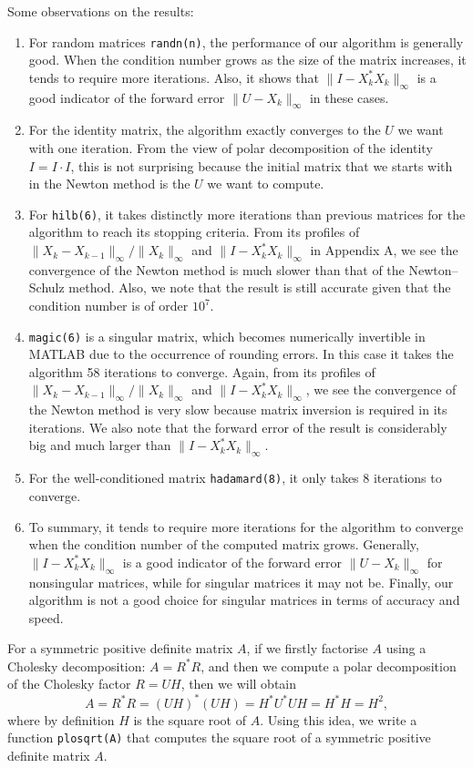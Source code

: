 \documentclass[12pt]{article}
\def\norm#1{\|#1\|}
\def\t#1{\texttt{\upshape #1}}
\begin{document}
Some observations on the results:
\begin{enumerate}
\item For random matrices \t{randn(n)}, the performance of our algorithm is generally good. When the condition number grows as the size of the matrix increases, it tends to require more iterations. Also, it shows that $\norm{I-X_k^*{X_k}}_\infty$ is a good indicator of the forward error $\norm{U-X_k}_\infty$ in these cases.
\item For the identity matrix, the algorithm exactly converges to the $U$ we want with one iteration. From the view of polar decomposition of the identity $I=I\cdot I$, this is not surprising because the initial matrix that we starts with in the Newton method is the $U$ we want to compute.
\item For \t{hilb(6)}, it takes distinctly more iterations than previous matrices for the algorithm to reach its stopping criteria. From its profiles of $\norm{X_k-X_{k-1}}_\infty/\norm{X_k}_\infty$ and $\norm{I-X_k^*{X_k}}_\infty$ in Appendix A, we see the convergence of the Newton method is much slower than that of the Newton--Schulz method. Also, we note that the result is still accurate given that the condition number is of order $10^7$.
\item \t{magic(6)} is a singular matrix, which becomes numerically invertible in MATLAB due to the occurrence of rounding errors. In this case it takes the algorithm 58 iterations to converge. Again, from its profiles of $\norm{X_k-X_{k-1}}_\infty/\norm{X_k}_\infty$ and $\norm{I-X_k^*{X_k}}_\infty$, we see the convergence of the Newton method is very slow because matrix inversion is required in its iterations. We also note that the forward error of the result is considerably big and much larger than $\norm{I-X_k^*{X_k}}_\infty$.
\item For the well-conditioned matrix \t{hadamard(8)}, it only takes 8  iterations to converge.
\item To summary, it tends to require more iterations for the algorithm to converge when the condition number of the computed matrix grows. Generally, $\norm{I-X_k^*{X_k}}_\infty$ is a good indicator of the forward error $\norm{U-X_k}_\infty$ for nonsingular matrices, while for singular matrices it may not be. Finally, our algorithm is not a good choice for singular matrices in terms of accuracy and speed.
\end{enumerate}
 \vspace{.2cm}
 
 
 For a symmetric positive definite matrix $A$, if we firstly factorise $A$ using a Cholesky decomposition: $A=R^*R$, and then we compute a polar decomposition of the Cholesky factor $R=UH$, then we will obtain
$$
A=R^*R=(UH)^*(UH)=H^*U^*UH=H^*H=H^2,
$$
where by definition $H$ is the square root of $A$. Using this idea, we write a function \t{plosqrt(A)} that computes the square root of a symmetric positive definite matrix $A$.
\end{document}
